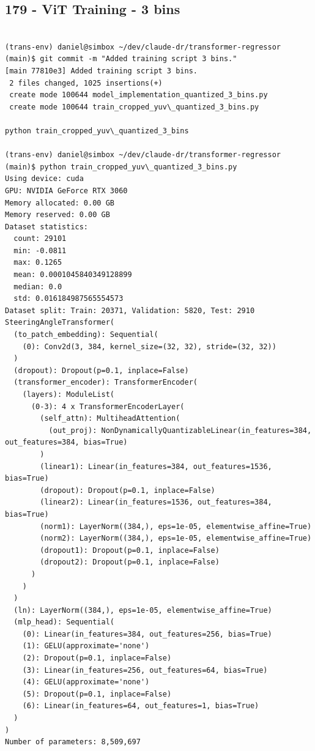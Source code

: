 \subsection{179 - ViT Training - 3 bins}
\label{app_res:179}

\begin{verbatim}

(trans-env) daniel@simbox ~/dev/claude-dr/transformer-regressor (main)$ git commit -m "Added training script 3 bins."
[main 77810e3] Added training script 3 bins.
 2 files changed, 1025 insertions(+)
 create mode 100644 model_implementation_quantized_3_bins.py
 create mode 100644 train_cropped_yuv\_quantized_3_bins.py

python train_cropped_yuv\_quantized_3_bins

(trans-env) daniel@simbox ~/dev/claude-dr/transformer-regressor (main)$ python train_cropped_yuv\_quantized_3_bins.py 
Using device: cuda
GPU: NVIDIA GeForce RTX 3060
Memory allocated: 0.00 GB
Memory reserved: 0.00 GB
Dataset statistics:
  count: 29101
  min: -0.0811
  max: 0.1265
  mean: 0.0001045840349128899
  median: 0.0
  std: 0.016184987565554573
Dataset split: Train: 20371, Validation: 5820, Test: 2910
SteeringAngleTransformer(
  (to_patch_embedding): Sequential(
    (0): Conv2d(3, 384, kernel_size=(32, 32), stride=(32, 32))
  )
  (dropout): Dropout(p=0.1, inplace=False)
  (transformer_encoder): TransformerEncoder(
    (layers): ModuleList(
      (0-3): 4 x TransformerEncoderLayer(
        (self_attn): MultiheadAttention(
          (out_proj): NonDynamicallyQuantizableLinear(in_features=384, out_features=384, bias=True)
        )
        (linear1): Linear(in_features=384, out_features=1536, bias=True)
        (dropout): Dropout(p=0.1, inplace=False)
        (linear2): Linear(in_features=1536, out_features=384, bias=True)
        (norm1): LayerNorm((384,), eps=1e-05, elementwise_affine=True)
        (norm2): LayerNorm((384,), eps=1e-05, elementwise_affine=True)
        (dropout1): Dropout(p=0.1, inplace=False)
        (dropout2): Dropout(p=0.1, inplace=False)
      )
    )
  )
  (ln): LayerNorm((384,), eps=1e-05, elementwise_affine=True)
  (mlp_head): Sequential(
    (0): Linear(in_features=384, out_features=256, bias=True)
    (1): GELU(approximate='none')
    (2): Dropout(p=0.1, inplace=False)
    (3): Linear(in_features=256, out_features=64, bias=True)
    (4): GELU(approximate='none')
    (5): Dropout(p=0.1, inplace=False)
    (6): Linear(in_features=64, out_features=1, bias=True)
  )
)
Number of parameters: 8,509,697


\end{verbatim}
